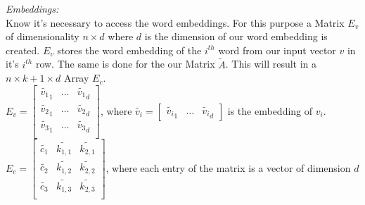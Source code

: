 \textit{Embeddings:}\\
Know it's necessary to access the word embeddings. For this purpose a Matrix $E_v$ of dimensionality $n \times d$ where $d$ is the dimension of our word embedding is created. $E_v$ stores the word embedding of the $i^{th}$ word from our input vector $v$ in it's $i^{th}$ row. The same is done for the our Matrix $\tilde{A}$. This will result in a $n \times k+1 \times d$ Array $E_c$. \\
 $E_v = \begin{bmatrix}
\tilde{v_1}_1 & \ldots & \tilde{v_1}_d\\
\tilde{v_2}_1 & \ldots & \tilde{v_2}_d\\
\tilde{v_3}_1 & \ldots & \tilde{v_3}_d\\
\end{bmatrix}
$, where $\tilde{v_i} = \begin{bmatrix}
\tilde{v_i}_1 & \ldots & \tilde{v_i}_d \end{bmatrix}$ is the embedding of $v_i$.  \\


$E_c = \begin{bmatrix}
\tilde{c_1 }& \tilde{k_{1,1}} & \tilde{k_{2,1}} \\
\tilde{c_2 }& \tilde{k_{1,2}}& \tilde{k_{2,2}} \\
\tilde{c_3 }&\tilde{ k_{1,3} }& \tilde{k_{2,3}}\\
\end{bmatrix}$,
where each entry of the matrix is a vector of dimension $d$\\

